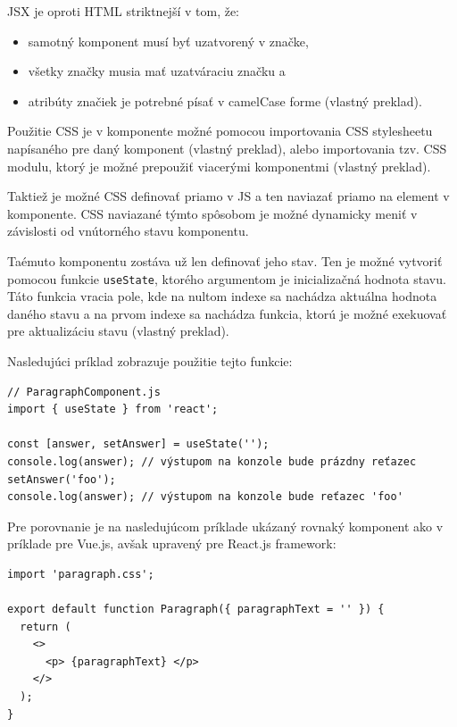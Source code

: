 JSX je oproti HTML striktnejší v tom, že:
\begin{itemize}
\item {samotný komponent musí byť uzatvorený v značke,}
\item {všetky značky musia mať uzatváraciu značku a}
\item {atribúty značiek je potrebné písať v camelCase forme \cite{jsx_rules} (vlastný preklad).}
\end{itemize}

Použitie CSS je v komponente možné pomocou importovania CSS stylesheetu napísaného pre daný komponent \cite{reactjs_stylesheet} (vlastný preklad), alebo importovania tzv. CSS modulu, ktorý je možné prepoužiť viacerými komponentmi \cite{reactjs_stylesheet_module} (vlastný preklad).

Taktiež je možné CSS definovať priamo v JS a ten naviazať priamo na element v komponente. CSS naviazané týmto spôsobom je možné dynamicky meniť v závislosti od vnútorného stavu komponentu.

Taémuto komponentu zostáva už len definovať jeho stav. Ten je možné vytvoriť pomocou funkcie \texttt{useState}, ktorého argumentom je inicializačná hodnota stavu. Táto funkcia vracia pole, kde na nultom indexe sa nachádza aktuálna hodnota daného stavu a na prvom indexe sa nachádza funkcia, ktorú je možné exekuovať pre aktualizáciu stavu \cite{react_state} (vlastný preklad).

Nasledujúci príklad zobrazuje použitie tejto funkcie:

\begin{minipage}[]{\linewidth}
\begin{verbatim}
// ParagraphComponent.js
import { useState } from 'react';

const [answer, setAnswer] = useState('');
console.log(answer); // výstupom na konzole bude prázdny reťazec
setAnswer('foo');
console.log(answer); // výstupom na konzole bude reťazec 'foo'
\end{verbatim}
\end{minipage}

\clearpage

Pre porovnanie je na nasledujúcom príklade ukázaný rovnaký komponent ako v príklade pre Vue.js, avšak upravený pre React.js framework:

\begin{minipage}[]{\linewidth}
\begin{verbatim}
import 'paragraph.css';

export default function Paragraph({ paragraphText = '' }) {
  return (
    <>
      <p> {paragraphText} </p>
    </>
  );
}
\end{verbatim}
\end{minipage}

